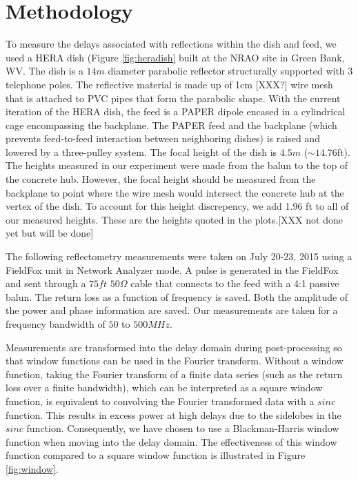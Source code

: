 \documentclass[12pt,preprint]{aastex}
\begin{document}
\section{Methodology}{\label{sec:methods}}

To measure the delays associated with reflections within the dish and feed, we
used a HERA dish (Figure \ref{fig:heradish} built at the NRAO site in Green
Bank, WV. The dish is a $14m$ diameter parabolic reflector structurally
supported with 3 telephone poles. The reflective material is made up of 1cm
[XXX?] wire
mesh that is attached to PVC pipes that form the parabolic shape. With the
current iteration of the HERA dish, the feed is a PAPER dipole encased in a cylindrical cage
encompassing the backplane. The PAPER feed and the backplane (which prevents
feed-to-feed interaction between neighboring dishes) is raised and lowered by a
three-pulley system. The focal height of the dish is $4.5m$ ($\sim{14.76}$ft).
The heights measured in our experiment were made from the balun to the top of
the concrete hub. However, the focal height should be measured from the
backplane to point where the wire mesh would intersect the concrete hub at the
vertex of the dish. To account for this height discrepency, we add 1.96 ft to
all of our measured heights. These are the heights quoted in the plots.[XXX not
done yet but will be done]

The following reflectometry measurements were taken on July 20-23, 2015 using a
FieldFox unit in Network Analyzer mode. A pulse is generated in the FieldFox
and sent through a $75ft$ $50\Omega$ cable that connects to the feed with a 4:1
passive balun. The return loss as a function of frequency is saved. Both
the amplitude of the power and phase information are saved. Our
measurements are taken for a frequency bandwidth of $50$ to $500MHz$. 

Measurements are transformed into the delay domain during post-processing so that window functions
can be used in the Fourier transform. Without a window function, taking the Fourier transform of a finite data series (such as the return loss over a finite bandwidth), which can be interpreted as a square window function, is equivalent to convolving the Fourier transformed data with a $sinc$ function. This results in excess power at high delays due to the sidelobes in the $sinc$ function. Consequently, we have chosen to use a Blackman-Harris window function when moving into the delay domain. The effectiveness of this window function compared to a square window function is illustrated in Figure \ref{fig:window}.
\end{document}
